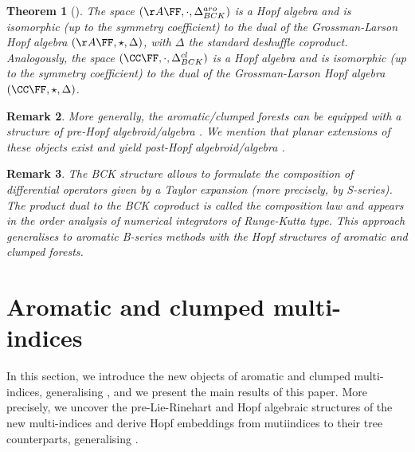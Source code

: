 \documentclass[a4paper,11pt]{article}
\newtheorem{theorem}{Theorem}[section]
\newtheorem{remark}[theorem]{Remark}
\begin{document}
\begin{theorem}[\cite{Bogfjellmo19aso, Bronasco22cef}]
The space $(\AA\FF,\cdot,\Delta_{BCK}^{aro})$ is a Hopf algebra and is isomorphic (up to the symmetry coefficient) to the dual of the Grossman-Larson Hopf algebra $(\AA\FF,\star,\Delta)$, with $\Delta$ the standard deshuffle coproduct.
Analogously, the space $(\CC\FF,\cdot,\Delta_{BCK}^{cl})$ is a Hopf algebra and is isomorphic (up to the symmetry coefficient) to the dual of the Grossman-Larson Hopf algebra $(\CC\FF,\star,\Delta)$.
\end{theorem}


\begin{remark}
More generally, the aromatic/clumped forests can be equipped with a structure of pre-Hopf algebroid/algebra \cite{Bronasco22cef}. We mention that planar extensions of these objects exist and yield post-Hopf algebroid/algebra \cite{Li23pha, Busnot25pha, Busnot26tft}.
\end{remark}

\begin{remark}
The BCK structure allows to formulate the composition of differential operators given by a Taylor expansion (more precisely, by S-series). The product dual to the BCK coproduct is called the composition law and appears in the order analysis of numerical integrators of Runge-Kutta type.
This approach generalises to aromatic B-series methods \cite{MuntheKaas16abs, Bogfjellmo19aso, Laurent23tab} with the Hopf structures of aromatic and clumped forests.
\end{remark}



























\section{Aromatic and clumped multi-indices}
\label{section:aromatic_multi-indices}

In this section, we introduce the new objects of aromatic and clumped multi-indices, generalising \cite{Lejay22cgr, Linares21tsg}, and we present the main results of this paper. More precisely, we uncover the pre-Lie-Rinehart and Hopf algebraic structures of the new multi-indices and derive Hopf embeddings from mutiindices to their tree counterparts, generalising \cite{Zhu24fna}.
\end{document}

